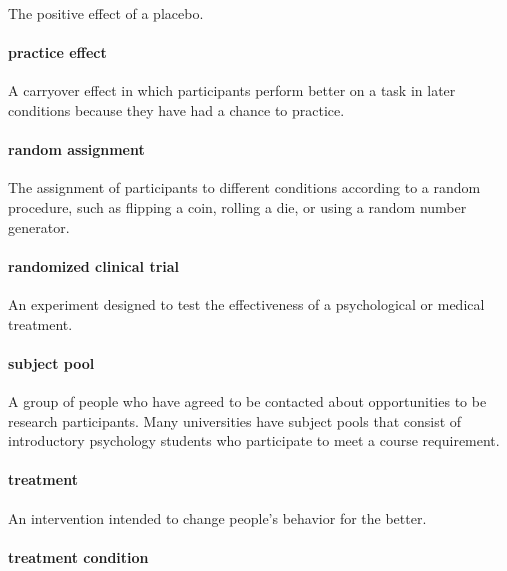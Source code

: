 \documentclass[
]{krantz}
\begin{document}
The positive effect of a placebo.

\paragraph*{practice effect}\label{practice-effect}

A carryover effect in which participants perform better on a task in later conditions because they have had a chance to practice.

\paragraph*{random assignment}\label{random-assignment-1}

The assignment of participants to different conditions according to a random procedure, such as flipping a coin, rolling a die, or using a random number generator.

\paragraph*{randomized clinical trial}\label{randomized-clinical-trial}

An experiment designed to test the effectiveness of a psychological or medical treatment.

\paragraph*{subject pool}\label{subject-pool}

A group of people who have agreed to be contacted about opportunities to be research participants. Many universities have subject pools that consist of introductory psychology students who participate to meet a course requirement.

\paragraph*{treatment}\label{treatment}

An intervention intended to change people's behavior for the better.

\paragraph*{treatment condition}\label{treatment-condition}
\end{document}
